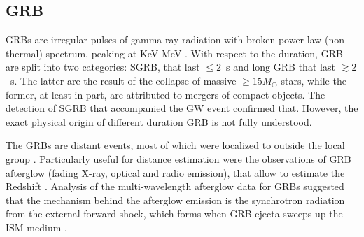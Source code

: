 \subsection{\ac{GRB}}

\acp{GRB} are irregular pulses of gamma-ray radiation with broken power-law 
(non-thermal) spectrum, peaking at KeV-MeV \citep{Band:1993,Kouveliotou:1993,Meegan:1992xg}.
%
With respect to the duration, \ac{GRB} are split into two categories: \ac{SGRB}, 
that last ${\leq}2$~s and long \ac{GRB} that last ${\gtrsim}2$~s. The latter are the 
result of the collapse of massive ${\geq}15M_{\odot}$ stars, while the former, at 
least in part, are attributed to mergers of compact objects. 
The detection of \ac{SGRB} \GRB{} that accompanied 
the \ac{GW} event \GW{} \citep{TheLIGOScientific:2017qsa} confirmed that. However, the exact physical 
origin of different duration \ac{GRB} is not fully understood.
%

The \acp{GRB} are distant events, most of which were localized to outside the local 
group \citep[\eg][]{Mao:1992,Piran:1992,Fenimore:1993}. Particularly useful for distance 
estimation were the observations of \ac{GRB} afterglow (fading X-ray, optical and radio emission), 
that allow to estimate the Redshift \citep[\eg][]{Costa:1997cg,Frontera:1997ae}.
%
Analysis of the multi-wavelength afterglow data for \acp{GRB} \citep[\eg][]{Panaitescu:2001bx} 
suggested that the mechanism behind the afterglow emission is the synchrotron radiation from the 
external forward-shock, which forms when \ac{GRB}-ejecta sweeps-up the \ac{ISM}
medium
\citep{Rees:1992ek,Paczynski:1993gz,Meszaros:1993ju,Meszaros:1996sv}.
%

